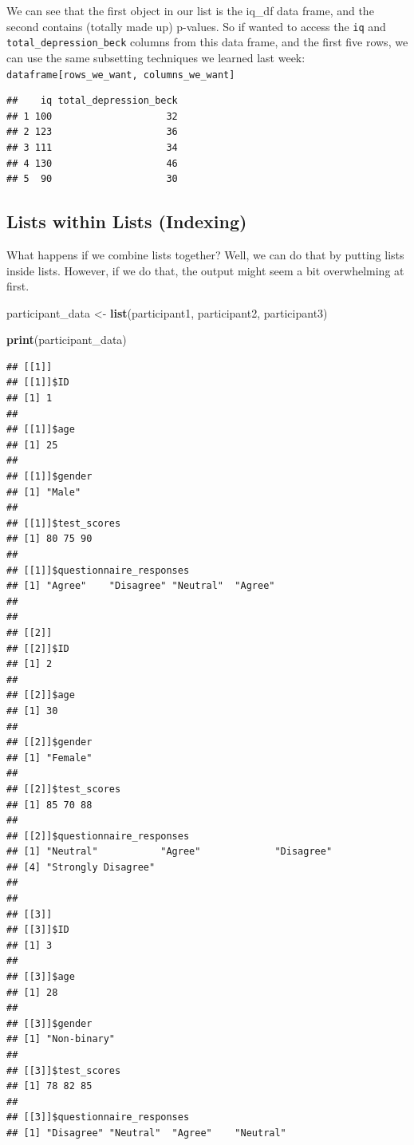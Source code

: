 \documentclass[
]{book}
\newenvironment{Shaded}{\begin{snugshade}}{\end{snugshade}}
\newcommand{\DecValTok}[1]{\textcolor[rgb]{0.00,0.00,0.81}{#1}}
\newcommand{\FunctionTok}[1]{\textcolor[rgb]{0.13,0.29,0.53}{\textbf{#1}}}
\newcommand{\NormalTok}[1]{#1}
\newcommand{\OtherTok}[1]{\textcolor[rgb]{0.56,0.35,0.01}{#1}}
\newcommand{\SpecialCharTok}[1]{\textcolor[rgb]{0.81,0.36,0.00}{\textbf{#1}}}
\newcommand{\StringTok}[1]{\textcolor[rgb]{0.31,0.60,0.02}{#1}}
\begin{document}
We can see that the first object in our list is the iq\_df data frame, and the second contains (totally made up) p-values. So if wanted to access the \texttt{iq} and \texttt{total\_depression\_beck} columns from this data frame, and the first five rows, we can use the same subsetting techniques we learned last week: \texttt{dataframe{[}rows\_we\_want,\ columns\_we\_want{]}}

\begin{Shaded}
\end{Shaded}

\begin{verbatim}
##    iq total_depression_beck
## 1 100                    32
## 2 123                    36
## 3 111                    34
## 4 130                    46
## 5  90                    30
\end{verbatim}

\hypertarget{lists-within-lists-indexing}{%
\subsection{Lists within Lists (Indexing)}\label{lists-within-lists-indexing}}

What happens if we combine lists together? Well, we can do that by putting lists inside lists. However, if we do that, the output might seem a bit overwhelming at first.

\begin{Shaded}
\begin{Highlighting}[]
\NormalTok{participant\_data }\OtherTok{\textless{}{-}} \FunctionTok{list}\NormalTok{(participant1, participant2, participant3)}
 
\FunctionTok{print}\NormalTok{(participant\_data)}
\end{Highlighting}
\end{Shaded}

\begin{verbatim}
## [[1]]
## [[1]]$ID
## [1] 1
## 
## [[1]]$age
## [1] 25
## 
## [[1]]$gender
## [1] "Male"
## 
## [[1]]$test_scores
## [1] 80 75 90
## 
## [[1]]$questionnaire_responses
## [1] "Agree"    "Disagree" "Neutral"  "Agree"   
## 
## 
## [[2]]
## [[2]]$ID
## [1] 2
## 
## [[2]]$age
## [1] 30
## 
## [[2]]$gender
## [1] "Female"
## 
## [[2]]$test_scores
## [1] 85 70 88
## 
## [[2]]$questionnaire_responses
## [1] "Neutral"           "Agree"             "Disagree"         
## [4] "Strongly Disagree"
## 
## 
## [[3]]
## [[3]]$ID
## [1] 3
## 
## [[3]]$age
## [1] 28
## 
## [[3]]$gender
## [1] "Non-binary"
## 
## [[3]]$test_scores
## [1] 78 82 85
## 
## [[3]]$questionnaire_responses
## [1] "Disagree" "Neutral"  "Agree"    "Neutral"
\end{verbatim}
\end{document}
